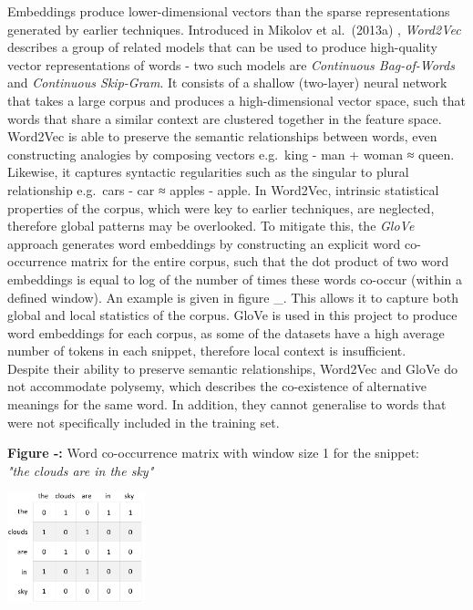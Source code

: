 \documentclass[12pt,a4paper]{article}
\begin{document}
 Embeddings produce lower-dimensional vectors than the sparse representations generated by earlier techniques. Introduced in Mikolov et al.\ (2013a) \cite{mikolov2013efficient}, \textit{Word2Vec} describes a group of related models that can be used to produce high-quality vector representations of words - two such models are \textit{Continuous Bag-of-Words} and \textit{Continuous Skip-Gram}. It consists of a shallow (two-layer) neural network that takes a large corpus and produces a high-dimensional vector space, such that words that share a similar context are clustered together in the feature space. Word2Vec is able to preserve the semantic relationships between words, even constructing analogies by composing vectors e.g.\ king - man + woman ≈ queen. Likewise, it captures syntactic regularities such as the singular to plural relationship e.g.\ cars - car ≈ apples - apple. In Word2Vec, intrinsic statistical properties of the corpus, which were key to earlier techniques, are neglected, therefore global patterns may be overlooked. To mitigate this, the \textit{GloVe} \cite{pennington2014glove} approach generates word embeddings by constructing an explicit word co-occurrence matrix for the entire corpus, such that the dot product of two word embeddings is equal to log of the number of times these words co-occur (within a defined window). An example is given in figure \_. This allows it to capture both global and local statistics of the corpus. GloVe is used in this project to produce word embeddings for each corpus, as some of the datasets have a high average number of tokens in each snippet, therefore local context is insufficient.\\

Despite their ability to preserve semantic relationships, Word2Vec and GloVe do not accommodate polysemy, which describes the co-existence of alternative meanings for the same word. In addition, they cannot generalise to words that were not specifically included in the training set.

\begin{center}
	\textbf{Figure -:} Word co-occurrence matrix with window size 1 for the snippet:\\ \textit{"the clouds are in the sky"}
\end{center}
\begin{center}
	\includegraphics[width=0.3\textwidth]{Images/glovediagram.png}
	\label{GloVe Pipeline}
\end{center}
\end{document}
